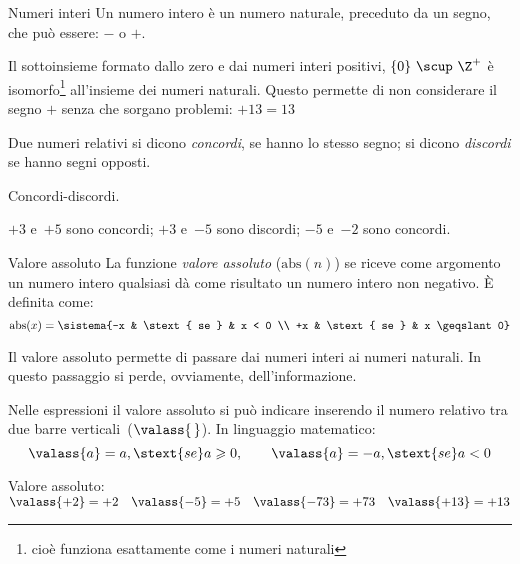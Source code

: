 \begin{definizione}{Numeri interi}{}
Un numero intero è un numero naturale, preceduto da un segno,
che può essere: \(-\) o \(+\).
\end{definizione}

\begin{osservazione}{}{}
Il sottoinsieme formato dallo zero e dai numeri interi positivi, 
\(\{0\} ~\scup~ \Z^+\) 
è isomorfo\footnote{
cioè funziona esattamente come i numeri naturali} 
all'insieme dei numeri naturali.
Questo permette di non considerare il segno \(+\) senza che sorgano 
problemi: \(+13 = 13\)
\end{osservazione}

\begin{definizione}{}{}
Due numeri relativi si dicono \emph{concordi}, se hanno lo stesso segno; 
si dicono \emph{discordi} se hanno segni opposti.
\end{definizione}

\begin{esempio}{}{}
Concordi-discordi.

\(+3\) e~\(+5\) sono concordi; \quad 
\(+3\) e~\(-5\) sono discordi; \quad 
\(-5\) e~\(-2\) sono concordi.
\end{esempio}

\begin{definizione}{Valore assoluto}{}
La funzione \emph{valore assoluto}
(\(\mathrm{abs}(n)\)) se riceve come argomento 
un numero intero qualsiasi dà come risultato un numero intero non negativo.
È definita come:
\[\mathrm{abs}(x) = 
\sistema{-x & \stext{ se } & x < 0 \\ +x & \stext{ se } & x \geqslant 0}\]
\end{definizione}

Il valore assoluto permette di passare dai numeri interi ai numeri naturali. 
In questo passaggio si perde, ovviamente, dell'informazione.

Nelle espressioni il valore assoluto si può indicare inserendo il numero 
relativo tra due barre verticali~(\(\valass{\,}\)). In linguaggio matematico:
\[\valass{a}=a,\stext{ se }a\geqslant0,\qquad 
  \valass{a}=-a,\stext{ se }a<0\]

\begin{esempio}{}{}
Valore assoluto: \\
\(\valass{+2}=+2 \quad \valass{-5}=+5 \quad 
\valass{-73}=+73 \quad \valass{+13}=+13\)
\end{esempio}

